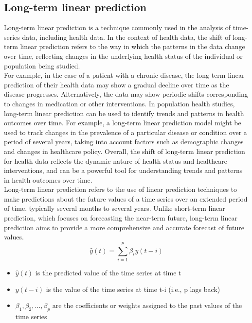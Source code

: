     \subsection{Long-term linear prediction} \label{subsec:longlp}
    Long-term linear prediction is a technique commonly used in the analysis of time-series data, including health data. In the context of health data,
    the shift of long-term linear prediction refers to the way in which the patterns in the data change over time, reflecting changes in the underlying
    health status of the individual or population being studied.\\
    For example, in the case of a patient with a chronic disease, the long-term linear prediction of their health data may show a gradual decline over
    time as the disease progresses. Alternatively, the data may show periodic shifts corresponding to changes in medication or other interventions.
    In population health studies, long-term linear prediction can be used to identify trends and patterns in health outcomes over time.
    For example, a long-term linear prediction model might be used to track changes in the prevalence of a particular disease or condition
    over a period of several years, taking into account factors such as demographic changes and changes in healthcare policy.
    Overall, the shift of long-term linear prediction for health data reflects the dynamic nature of health status and healthcare interventions,
    and can be a powerful tool for understanding trends and patterns in health outcomes over time.
\\
    Long-term linear prediction refers to the use of linear prediction techniques to make predictions about the future values of a time series
    over an extended period of time, typically several months to several years. Unlike short-term linear prediction, which focuses on forecasting the
    near-term future, long-term linear prediction aims to provide a more comprehensive and accurate forecast of future values.
    \begin{equation}
        \hat{y}(t) = \sum_{i=1}^{p} \beta_i y(t-i)
    \end{equation}
    \begin{itemize}
        \item $\hat{y}(t)$ is the predicted value of the time series at time t
        \item $y(t-i)$ is the value of the time series at time t-i (i.e., p lags back)
        \item $\beta_1, \beta_2, \dots, \beta_p$ are the coefficients or weights assigned to the past values of the time series
    \end{itemize}
    

